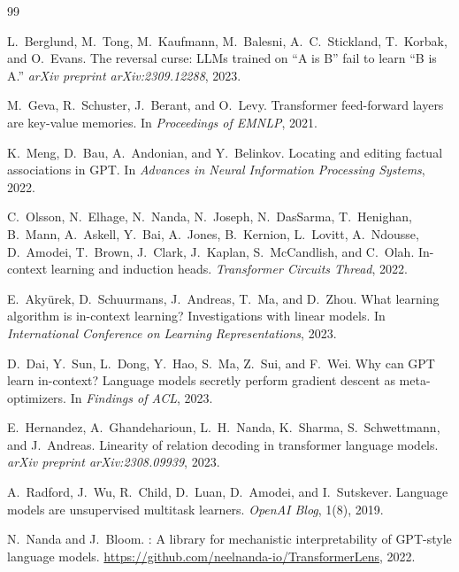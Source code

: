 \documentclass[11pt]{article}
\begin{document}
\begin{thebibliography}{99}

L.~Berglund, M.~Tong, M.~Kaufmann, M.~Balesni, A.~C.~Stickland, T.~Korbak,
and O.~Evans.
\newblock The reversal curse: {LLMs} trained on ``{A} is {B}'' fail to learn
``{B} is {A}.''
\newblock \emph{arXiv preprint arXiv:2309.12288}, 2023.

M.~Geva, R.~Schuster, J.~Berant, and O.~Levy.
\newblock Transformer feed-forward layers are key-value memories.
\newblock In \emph{Proceedings of EMNLP}, 2021.

K.~Meng, D.~Bau, A.~Andonian, and Y.~Belinkov.
\newblock Locating and editing factual associations in {GPT}.
\newblock In \emph{Advances in Neural Information Processing Systems}, 2022.

C.~Olsson, N.~Elhage, N.~Nanda, N.~Joseph, N.~DasSarma, T.~Henighan,
B.~Mann, A.~Askell, Y.~Bai, A.~Jones, B.~Kernion, L.~Lovitt, A.~Ndousse,
D.~Amodei, T.~Brown, J.~Clark, J.~Kaplan, S.~McCandlish, and C.~Olah.
\newblock In-context learning and induction heads.
\newblock \emph{Transformer Circuits Thread}, 2022.

E.~Akyürek, D.~Schuurmans, J.~Andreas, T.~Ma, and D.~Zhou.
\newblock What learning algorithm is in-context learning? {I}nvestigations
with linear models.
\newblock In \emph{International Conference on Learning Representations}, 2023.

D.~Dai, Y.~Sun, L.~Dong, Y.~Hao, S.~Ma, Z.~Sui, and F.~Wei.
\newblock Why can {GPT} learn in-context? {L}anguage models secretly perform
gradient descent as meta-optimizers.
\newblock In \emph{Findings of ACL}, 2023.

E.~Hernandez, A.~Ghandeharioun, L.~H.~Nanda, K.~Sharma, S.~Schwettmann,
and J.~Andreas.
\newblock Linearity of relation decoding in transformer language models.
\newblock \emph{arXiv preprint arXiv:2308.09939}, 2023.

A.~Radford, J.~Wu, R.~Child, D.~Luan, D.~Amodei, and I.~Sutskever.
\newblock Language models are unsupervised multitask learners.
\newblock \emph{OpenAI Blog}, 1(8), 2019.

N.~Nanda and J.~Bloom.
: A library for mechanistic interpretability of
{GPT}-style language models.
\newblock \url{https://github.com/neelnanda-io/TransformerLens}, 2022.


\end{thebibliography}
\end{document}
